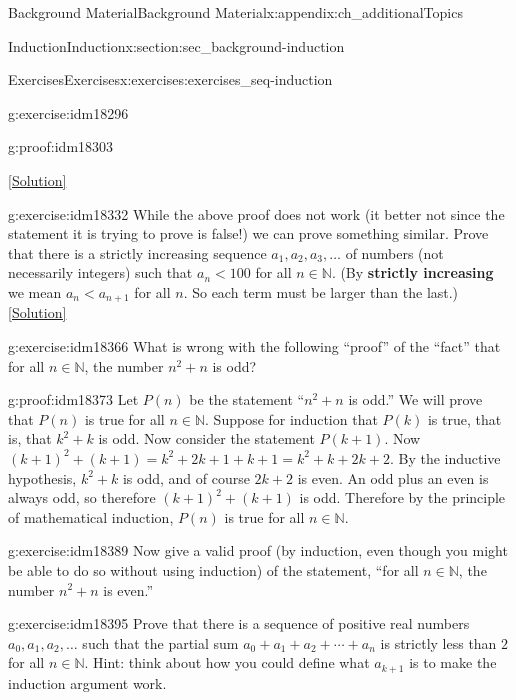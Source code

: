 \documentclass[oneside,10pt,]{book}
\newcommand{\terminology}[1]{\textbf{#1}}
\numberwithin{equation}{chapter}
\def\N{\mathbb N}
\newcommand{\lt}{<}
\begin{document}
\begin{appendixptx}{Background Material}{}{Background Material}{}{}{x:appendix:ch_additionalTopics}
\begin{sectionptx}{Induction}{}{Induction}{}{}{x:section:sec_background-induction}
\begin{exercises-subsection}{Exercises}{}{Exercises}{}{}{x:exercises:exercises_seq-induction}
\begin{divisionexercise}{12}{}{}{g:exercise:idm18296}
\begin{proofptx}{}{g:proof:idm18303}
\end{proofptx}
\space\hspace*{0pt}\hfill{\tiny\hyperlink{g:solution:idm18322-main}{[Solution]}}\end{divisionexercise}%
\begin{divisionexercise}{13}{}{}{g:exercise:idm18332}%
While the above proof does not work (it better not since the statement it is trying to prove is false!) we can prove something similar. Prove that there is a strictly increasing sequence \(a_1, a_2, a_3, \ldots\) of numbers (not necessarily integers) such that \(a_n \lt  100\) for all \(n \in \N\). (By \terminology{strictly increasing} we mean \(a_n \lt  a_{n+1}\) for all \(n\). So each term must be larger than the last.)%
\space\hspace*{0pt}\hfill{\tiny\hyperlink{g:solution:idm18341-main}{[Solution]}}\end{divisionexercise}%
\begin{divisionexercise}{14}{}{}{g:exercise:idm18366}%
What is wrong with the following ``proof'' of the ``fact'' that for all \(n \in \N\), the number \(n^2 + n\) is odd?%
\begin{proofptx}{}{g:proof:idm18373}
Let \(P(n)\) be the statement ``\(n^2 + n\) is odd.'' We will prove that \(P(n)\) is true for all \(n \in \N\). Suppose for induction that \(P(k)\) is true, that is, that \(k^2 + k\) is odd. Now consider the statement \(P(k+1)\). Now \((k+1)^2 + (k+1) = k^2 + 2k + 1 + k + 1 = k^2 + k + 2k + 2\). By the inductive hypothesis, \(k^2 + k\) is odd, and of course \(2k + 2\) is even. An odd plus an even is always odd, so therefore \((k+1)^2 + (k+1)\) is odd. Therefore by the principle of mathematical induction, \(P(n)\) is true for all \(n \in \N\).%
\end{proofptx}
\end{divisionexercise}%
\begin{divisionexercise}{15}{}{}{g:exercise:idm18389}%
Now give a valid proof (by induction, even though you might be able to do so without using induction) of the statement, ``for all \(n \in \N\), the number \(n^2 + n\) is even.''%
\end{divisionexercise}%
\begin{divisionexercise}{16}{}{}{g:exercise:idm18395}%
Prove that there is a sequence of positive real numbers \(a_0, a_1, a_2, \ldots\) such that the partial sum \(a_0 + a_1 + a_2 + \cdots + a_n\) is strictly less than \(2\) for all \(n \in \N\). Hint: think about how you could define what \(a_{k+1}\) is to make the induction argument work.%

\end{divisionexercise}
\end{exercises-subsection}
\end{sectionptx}
\end{appendixptx}
\end{document}
